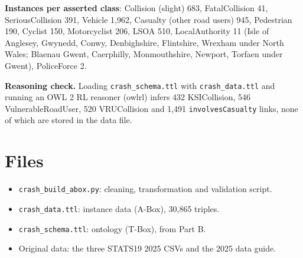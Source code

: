 \documentclass[10.5pt,a4paper]{article}
\newcommand{\cls}[1]{\textsf{#1}}
\begin{document}
\noindent\textbf{Instances per asserted class}: \cls{Collision} (slight) 683, \cls{FatalCollision} 41, \cls{SeriousCollision} 391, \cls{Vehicle} 1,962, \cls{Casualty} (other road users) 945, \cls{Pedestrian} 190, \cls{Cyclist} 150, \cls{Motorcyclist} 206, \cls{LSOA} 510, \cls{LocalAuthority} 11 (Isle of Anglesey, Gwynedd, Conwy, Denbighshire, Flintshire, Wrexham under North Wales; Blaenau Gwent, Caerphilly, Monmouthshire, Newport, Torfaen under Gwent), \cls{PoliceForce} 2.

\noindent\textbf{Reasoning check.} Loading \texttt{crash\_schema.ttl} with \texttt{crash\_data.ttl} and running an OWL 2 RL reasoner (owlrl) infers 432 \cls{KSICollision}, 546 \cls{VulnerableRoadUser}, 520 \cls{VRUCollision} and 1,491 \texttt{involvesCasualty} links, none of which are stored in the data file.

\section{Files}
\begin{itemize}[nosep]
\item \texttt{crash\_build\_abox.py}: cleaning, transformation and validation script.
\item \texttt{crash\_data.ttl}: instance data (A-Box), 30,865 triples.
\item \texttt{crash\_schema.ttl}: ontology (T-Box), from Part B.
\item Original data: the three STATS19 2025 CSVs and the 2025 data guide.
\end{itemize}
\end{document}
